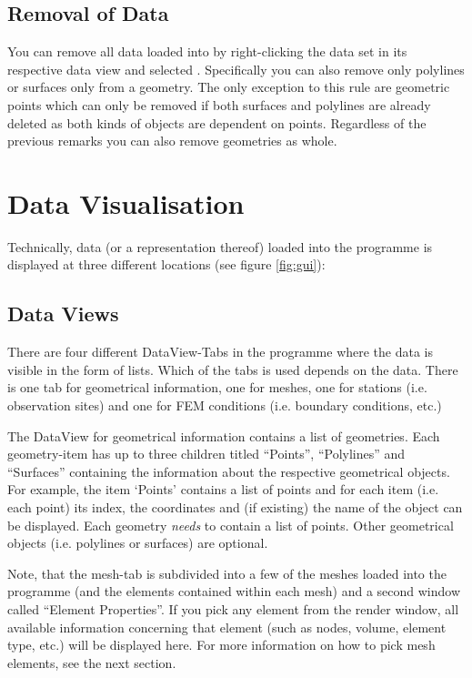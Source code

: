 \subsection{Removal of Data}

You can remove all data loaded into \ogs by right-clicking the data set in its respective data view and selected . Specifically you can also remove only polylines or surfaces only from a geometry. The only exception to this rule are geometric points which can only be removed if both surfaces and polylines are already deleted as both kinds of objects are dependent on points. Regardless of the previous remarks you can also remove geometries as whole.

\section{Data Visualisation}
\label{datavisualisation}

Technically, data (or a representation thereof) loaded into the programme is displayed at three different locations (see figure \ref{fig:gui}):

\subsection{Data Views}

There are four different DataView-Tabs in the programme where the data is visible in the form of lists. Which of the tabs is used depends on the data. There is one tab for geometrical information, one for meshes, one for stations (i.e. observation sites) and one for FEM conditions (i.e. boundary conditions, etc.)

The DataView for geometrical information contains a list of geometries. Each geometry-item has up to three children titled ``Points'', ``Polylines'' and ``Surfaces'' containing the information about the respective geometrical objects. For example, the item `Points' contains a list of points and for each item (i.e. each point) its index, the coordinates and (if existing) the name of the object can be displayed. Each geometry \emph{needs} to contain a list of points. Other geometrical objects (i.e. polylines or surfaces) are optional.

Note, that the mesh-tab is subdivided into a few of the meshes loaded into the programme (and the elements contained within each mesh) and a second window called ``Element Properties''. If you pick any element from the render window, all available information concerning that element (such as nodes, volume, element type, etc.) will be displayed here. For more information on how to pick mesh elements, see the next section.

